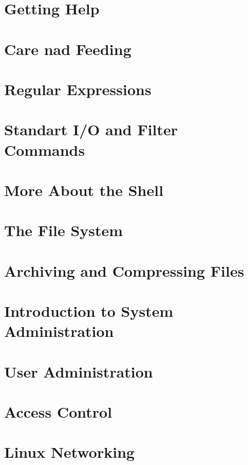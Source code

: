 \documentclass[10pt,a5paper]{book}
\begin{document}
\chapter{Getting Help}
\chapter{Care nad Feeding}
\chapter{Regular Expressions}
\chapter{Standart I/O and Filter Commands}
\chapter{More About the Shell}
\chapter{The File System}
\chapter{Archiving and Compressing Files}
\chapter{Introduction to System Administration}
\chapter{User Administration}
\chapter{Access Control}
\chapter{Linux Networking}
\end{document}

